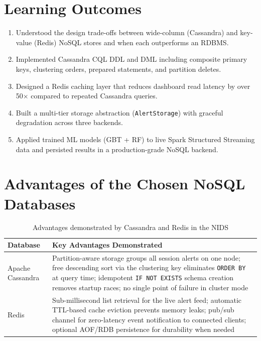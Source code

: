 \documentclass[12pt,a4paper]{report}
\begin{document}
\section{Learning Outcomes}
\begin{enumerate}
  \item Understood the design trade-offs between wide-column (Cassandra) and
        key-value (Redis) NoSQL stores and when each outperforms an RDBMS.
  \item Implemented Cassandra CQL DDL and DML including composite primary
        keys, clustering orders, prepared statements, and partition deletes.
  \item Designed a Redis caching layer that reduces dashboard read latency by
        over 50$\times$ compared to repeated Cassandra queries.
  \item Built a multi-tier storage abstraction (\texttt{AlertStorage}) with
        graceful degradation across three backends.
  \item Applied trained ML models (GBT + RF) to live Spark Structured Streaming
        data and persisted results in a production-grade NoSQL backend.
\end{enumerate}

\section{Advantages of the Chosen NoSQL Databases}
\begin{table}[H]
  \centering
  \caption{Advantages demonstrated by Cassandra and Redis in the NIDS}
  \label{tab:nosql-advantages}
  \begin{tabularx}{\textwidth}{lX}
    \toprule
    \textbf{Database} & \textbf{Key Advantages Demonstrated} \\
    \midrule
    Apache Cassandra &
    Partition-aware storage groups all session alerts on one node;
    free descending sort via the clustering key eliminates \texttt{ORDER BY}
    at query time; idempotent \texttt{IF NOT EXISTS} schema creation removes
    startup races; no single point of failure in cluster mode \\
    Redis &
    Sub-millisecond list retrieval for the live alert feed;
    automatic TTL-based cache eviction prevents memory leaks;
    pub/sub channel for zero-latency event notification to connected clients;
    optional AOF/RDB persistence for durability when needed \\
    \bottomrule
  \end{tabularx}
\end{table}
\end{document}
